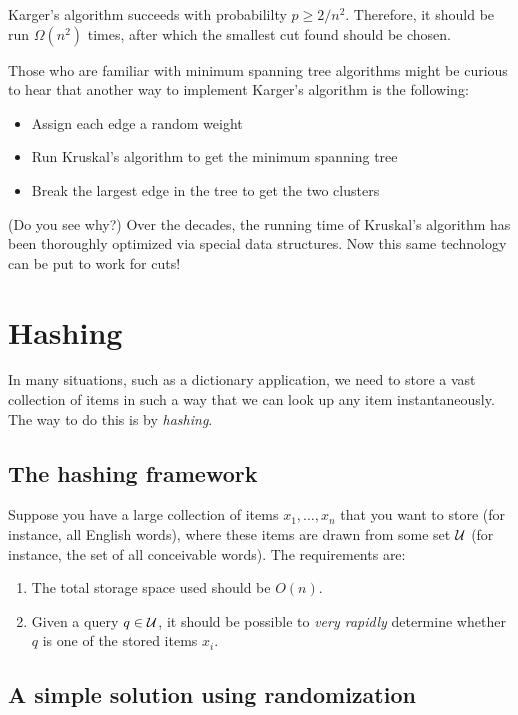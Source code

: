 Karger's algorithm succeeds with probabililty $p \geq 2/n^2$. Therefore,
it should be run $\Omega(n^2)$ times, after which the smallest cut found should
be chosen.

Those who are familiar with minimum spanning tree algorithms might be curious to
hear that another way to implement Karger's algorithm is the following:
\begin{itemize}
\item Assign each edge a random weight
\item Run Kruskal's algorithm to get the minimum spanning tree
\item Break the largest edge in the tree to get the two clusters
\end{itemize}
(Do you see why?) Over the decades, the running time of Kruskal's algorithm has 
been thoroughly optimized via special data structures. Now this same technology 
can be put to work for cuts!

\section{Hashing}

In many situations, such as a dictionary application, we need to store a vast 
collection of items in such a way that we can look up any item instantaneously. 
The way to do this is by {\it hashing}.

\subsection{The hashing framework}

Suppose you have a large collection of items $x_1, \ldots, x_n$ that you want 
to store (for instance, all English words), where these items are 
drawn from some set ${\cal U}$ (for instance, the set of all conceivable words). 
The requirements are:
\begin{enumerate}
\item The total storage space used should be $O(n)$.
\item Given a query $q \in {\cal U}$, it should be possible to {\it very rapidly}
determine whether $q$ is one of the stored items $x_i$.
\end{enumerate}

\subsection{A simple solution using randomization}

